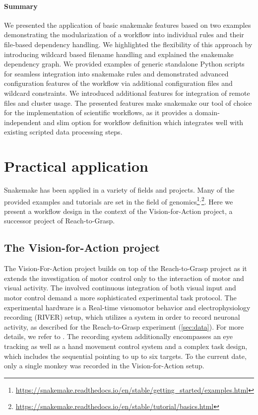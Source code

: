 \paragraph{Summary}
We presented the application of basic snakemake features based on two examples demonstrating the modularization of a workflow into individual rules and their file-based dependency handling. We highlighted the flexibility of this approach by introducing wildcard based filename handling and explained the snakemake dependency graph. We provided examples of generic standalone Python scripts for seamless integration into snakemake rules and demonstrated advanced configuration features of the workflow via additional configuration files and wildcard constraints. We introduced additional features for integration of remote files and cluster usage.
The presented features make snakemake our tool of choice for the implementation of scientific workflows, as it provides a domain-independent and slim option for workflow definition which integrates well with existing scripted data processing steps.


\section{Practical application}
Snakemake has been applied in a variety of fields and projects. Many of the provided examples and tutorials are set in the field of genomics\footnote{\url{https://snakemake.readthedocs.io/en/stable/getting_started/examples.html}}$^,$\footnote{\url{https://snakemake.readthedocs.io/en/stable/tutorial/basics.html}}. Here we present a workflow design in the context of the Vision-for-Action project, a successor project of Reach-to-Grasp.

\subsection{The Vision-for-Action project}
The Vision-For-Action project builds on top of the Reach-to-Grasp project as it extends the investigation of motor control only to the interaction of motor and visual activity. The involved continuous integration of both visual input and motor control demand a more sophisticated experimental task protocol. The experimental hardware is a Real-time visuomotor behavior and electrophysiology recording (RIVER) setup, which utilizes a  system in order to record neuronal activity, as described for the Reach-to-Grasp experiment (\cref{sec:data}). For more details, we refer to \citet{deHaan_2018,deHaan_2018a}. The recording system additionally encompasses an eye tracking as well as a hand movement control system and a complex task design, which includes the sequential pointing to up to six targets. To the current date, only a single monkey was recorded in the Vision-for-Action setup.

